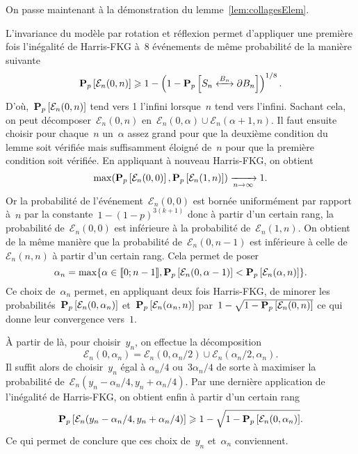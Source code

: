		On passe maintenant à la démonstration du lemme~\ref{lem:collagesElem}.
		\begin{dem}
			L'invariance du modèle par rotation et réflexion permet d'appliquer une première fois l'inégalité de Harris-FKG à~$8$ événements de même probabilité de la manière suivante
			\[
				\Pp{\mathcal{E}_n(0,n)} \geq 1 - \left(1 - \Pp{\relie[B_n]{S_n}{\partial B_n}} \right)^{1/8}.
			\]
			D'où,~$\bm{\mathrm{P}}_{p}\left[\mathcal{E}_n(0, n)\right]$ tend vers 1 l'infini lorsque~$n$ tend vers l'infini. Sachant cela, on peut décomposer~$\mathcal{E}_n(0, n)$ en~$\mathcal{E}_n(0, \alpha) \cup \mathcal{E}_n(\alpha + 1, n)$. Il faut ensuite choisir pour chaque~$n$ un~$\alpha$ assez grand pour que la deuxième condition du lemme soit vérifiée mais suffisamment éloigné de~$n$ pour que la première condition soit vérifiée. En appliquant à nouveau Harris-FKG, on obtient
			\[
				\max(\bm{\mathrm{P}}_{p}\left[\mathcal{E}_n(0, 0)\right], \bm{\mathrm{P}}_{p}\left[\mathcal{E}_n(1, n)\right]) \xrightarrow[n \to \infty]{} 1.
			\]
			Or la probabilité de l'événement~$\mathcal{E}_n(0,0)$ est bornée uniformément par rapport à~$n$ par la constante~$1 - (1-p)^{3(k+1)}$ donc à partir d'un certain rang, la probabilité de~$\mathcal{E}_n(0,0)$ est inférieure à la probabilité de~$\mathcal{E}_n(1, n)$. On obtient de la même manière que la probabilité de~$\mathcal{E}_n(0, n-1)$ est inférieure à celle de~$\mathcal{E}_n(n, n)$ à partir d'un certain rang. Cela permet de poser
			\[
				\alpha_n = \max \{ \alpha \in \llbracket 0;n-1 \rrbracket, \bm{\mathrm{P}}_{p}\left[\mathcal{E}_n(0, \alpha - 1)\right] < \bm{\mathrm{P}}_{p}\left[\mathcal{E}_n(\alpha, n)\right] \}.
			\]
			Ce choix de~$\alpha_n$ permet, en appliquant deux fois Harris-FKG, de minorer les probabilités~$\bm{\mathrm{P}}_{p}\left[\mathcal{E}_n(0, \alpha_n)\right]$ et~$\bm{\mathrm{P}}_{p}\left[\mathcal{E}_n(\alpha_n, n)\right]$ par~$1 - \sqrt{1  - \bm{\mathrm{P}}_{p}\left[\mathcal{E}_n(0, n)\right]}$ ce qui donne leur convergence vers~$1$. 
	
			À partir de là, pour choisir~$y_n$, on effectue la décomposition
			\[
				\mathcal{E}_n(0, \alpha_n) = \mathcal{E}_n(0, \alpha_n/2) \cup \mathcal{E}_n(\alpha_n/2, \alpha_n).
			\]
			Il suffit alors de choisir~$y_n$ égal à $\alpha_n/4$ ou~$3\alpha_n/4$ de sorte à maximiser la probabilité de~$\mathcal{E}_n(y_n - \alpha_n/4, y_n + \alpha_n/4)$. Par une dernière application de l'inégalité de Harris-FKG, on obtient enfin à partir d'un certain rang
			\[
				\bm{\mathrm{P}}_{p}\left[\mathcal{E}_n(y_n - \alpha_n/4, y_n + \alpha_n/4)\right] \geqslant 1 - \sqrt{1 - \bm{\mathrm{P}}_{p}\left[\mathcal{E}_n(0, \alpha_n)\right]}.
			\]
			Ce qui permet de conclure que ces choix de~$y_n$ et~$\alpha_n$ conviennent.
		\end{dem}


